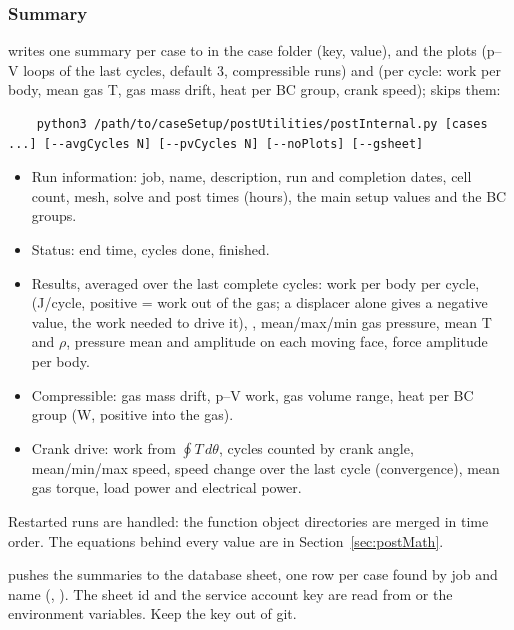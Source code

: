 \subsubsection{Summary}
 writes one summary per case to  in the case folder (key, value), and the plots  (p--V loops of the last  cycles, default 3, compressible runs) and  (per cycle: work per body, mean gas T, gas mass drift, heat per BC group, crank speed);  skips them:
\begin{lstlisting}
    python3 /path/to/caseSetup/postUtilities/postInternal.py [cases ...] [--avgCycles N] [--pvCycles N] [--noPlots] [--gsheet]
\end{lstlisting}
\begin{itemize}
    \item Run information: job, name, description, run and completion dates, cell count, mesh, solve and post times (hours), the main setup values and the BC groups.
    \item Status: end time, cycles done, finished.
    \item Results, averaged over the last  complete cycles: work per body per cycle,  (J/cycle, positive = work out of the gas; a displacer alone gives a negative value, the work needed to drive it), , mean/max/min gas pressure, mean T and $\rho$, pressure mean and amplitude on each moving face, force amplitude per body.
    \item Compressible: gas mass drift, p--V work, gas volume range, heat per BC group (W, positive into the gas).
    \item Crank drive: work from $\oint T\,d\theta$, cycles counted by crank angle, mean/min/max speed, speed change over the last cycle (convergence), mean gas torque, load power and electrical power.
\end{itemize}
Restarted runs are handled: the function object directories are merged in time order. The equations behind every value are in Section~\ref{sec:postMath}.

 pushes the summaries to the database sheet, one row per case found by job and name (, ). The sheet id and the service account key are read from  or the  environment variables. Keep the key out of git.

